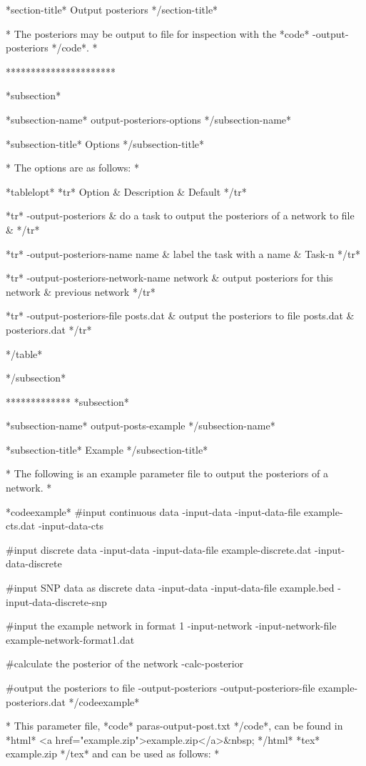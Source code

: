 *section-title* Output posteriors */section-title*


* The posteriors may be output to file for inspection with the *code* -output-posteriors */code*. *

**********************

*subsection*

*subsection-name* output-posteriors-options */subsection-name*

*subsection-title* Options */subsection-title*

* The options are as follows: *

*tablelopt* *tr* Option & Description & Default */tr*

*tr*
 -output-posteriors  & do a task to output the posteriors of a network to file &
*/tr*

*tr*
  -output-posteriors-name name & label the task with a name & Task-n
*/tr*

*tr*
  -output-posteriors-network-name network & output posteriors for this network & previous network
*/tr*

*tr*
  -output-posteriors-file posts.dat & output the posteriors to file posts.dat & posteriors.dat
*/tr*


*/table*

*/subsection*

************* *subsection*

*subsection-name* output-posts-example */subsection-name*

*subsection-title* Example */subsection-title*

* The following is an example parameter file to output the posteriors of a network. *

*codeexample* #input continuous data -input-data -input-data-file example-cts.dat -input-data-cts

#input discrete data -input-data -input-data-file example-discrete.dat -input-data-discrete

#input SNP data as discrete data -input-data -input-data-file example.bed -input-data-discrete-snp

#input the example network in format 1 -input-network -input-network-file example-network-format1.dat

#calculate the posterior of the network -calc-posterior

#output the posteriors to file -output-posteriors -output-posteriors-file example-posteriors.dat */codeexample*

* This parameter file, *code* paras-output-post.txt */code*, can be found in *html* <a href="example.zip">example.zip</a>&nbsp; */html* *tex* example.zip */tex* and can be used as follows: *

